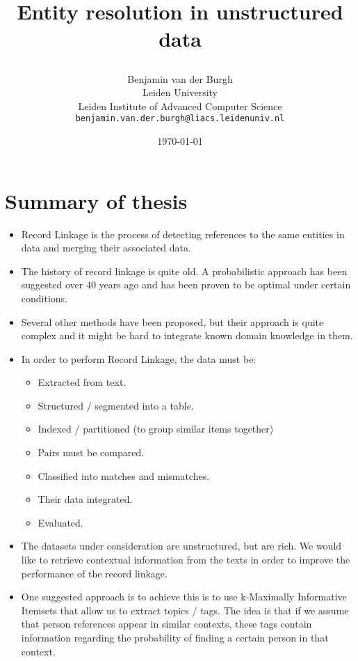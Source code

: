 \documentclass[paper=a4, fontsize=11pt]{scrartcl}					%
\title{ \vspace{-1in} 	\usefont{OT1}{bch}{b}{n}
		\huge \strut Entity resolution in unstructured data \strut
}
\author{
		\usefont{OT1}{bch}{m}{n} Benjamin van der Burgh\\
		\usefont{OT1}{bch}{m}{n} Leiden University\\
		\usefont{OT1}{bch}{m}{n} Leiden Institute of Advanced Computer Science\\
        \texttt{benjamin.van.der.burgh@liacs.leidenuniv.nl}
}
\date{\today}
\numberwithin{equation}{section}					%
\numberwithin{figure}{section}						%
\numberwithin{table}{section}						%
\begin{document}
\maketitle

\section*{Summary of thesis}

\begin{itemize}
	\item Record Linkage is the process of detecting references to the same entities in data and merging their associated data.
	\item The history of record linkage is quite old. A probabilistic approach has been suggested over 40 years ago and has been proven to be optimal under certain conditions.
	\item Several other methods have been proposed, but their approach is quite complex and it might be hard to integrate known domain knowledge in them.
	\item In order to perform Record Linkage, the data must be:
		\begin{itemize}
			\item Extracted from text.
			\item Structured / segmented into a table.
			\item Indexed / partitioned (to group similar items together)
			\item Pairs must be compared.
			\item Classified into matches and mismatches.
			\item Their data integrated.
			\item Evaluated.
		\end{itemize}
	\item The datasets under consideration are unstructured, but are rich. We would like to retrieve contextual information from the texts in order to improve the performance of the record linkage.
	\item One suggested approach is to achieve this is to use k-Maximally Informative Itemsets that allow us to extract topics / tags. The idea is that if we assume that person references appear in similar contexts, these tags contain information regarding the probability of finding a certain person in that context.
\end{itemize}

\end{document}
